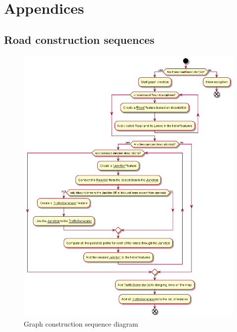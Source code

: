 \appendix
\section*{Appendices}
\renewcommand{\thesubsection}{\Alph{subsection}}


\fontsize{9}{11}\selectfont

\normalsize

\subsection{Road construction sequences}
\label{sec:roadConstructionSequences}
\begin{figure}[h]
  	\caption{Graph construction sequence diagram}
  	\label{fig:graphConstructSeqDiag}
  	\centering
  	\includegraphics[width=\textwidth]{figs/graphConstruction/GraphConstruction.png}
\end{figure}

